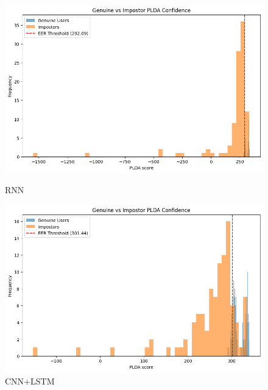 \begin{figure}[ht]
    \begin{minipage}{0.47\textwidth}
        \centering
        \includegraphics[width=\textwidth]{./ch4/rnn}
        \caption{RNN}
    \end{minipage}
    \begin{minipage}{0.47\textwidth}
        \centering
        \includegraphics[width=\textwidth]{./ch4/cnnlstm.png}
        \caption{CNN+LSTM}
    \end{minipage}


\end{figure}
